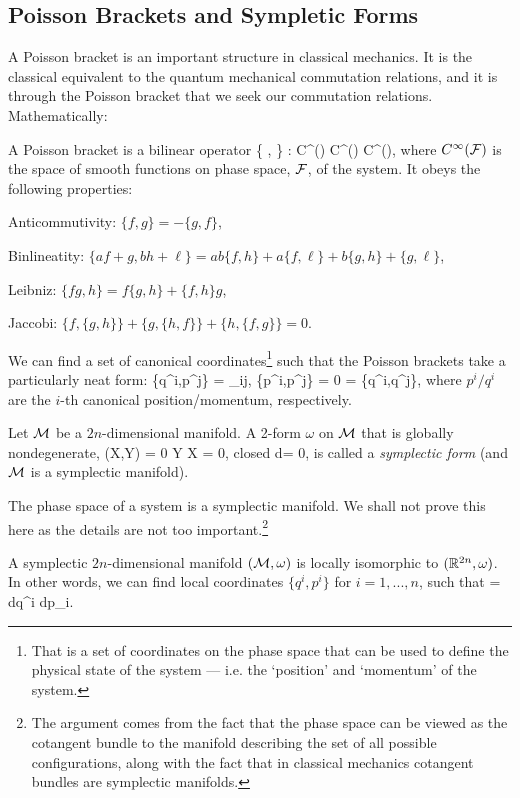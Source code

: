 \subsection{Poisson Brackets and Sympletic Forms}

A Poisson bracket is an important structure in classical mechanics. It is the classical equivalent to the quantum mechanical commutation relations, and it is through the Poisson bracket that we seek our commutation relations. Mathematically: 

A Poisson bracket is a bilinear operator 
\bse 
    \{ \cdot, \cdot \} : C^{\infty}(\cF) \times  C^{\infty}(\cF) \to  C^{\infty}(\cF),
\ese 
where $C^{\infty}(\mathcal{F})$ is the space of smooth functions on phase space, $\mathcal{F}$, of the system. It obeys the following properties: 
\ben 
\item Anticommutivity: $\{f,g\} = -\{g,f\}$, 
\item Binlineatity: $\{af+g,bh+\ell\} = ab\{f,h\} + a\{f,\ell\} + b\{g,h\} + \{g,\ell\}$,
\item Leibniz: $\{fg,h\} = f\{g,h\} + \{f,h\}g$,
\item Jaccobi: $\{f,\{g,h\}\} + \{g,\{h,f\}\} + \{h,\{f,g\}\} =0$.
\een 
\ed 

We can find a set of canonical coordinates\footnote{That is a set of coordinates on the phase space that can be used to define the physical state of the system --- i.e. the `position' and `momentum' of the system.} such that the Poisson brackets take a particularly neat form:
\be 
\label{eqn:PoissonCanonical}
    \{q^i,p^j\} = \del_{ij}, \qquad \{p^i,p^j\} = 0 = \{q^i,q^j\},
\ee 
where $p^i/q^i$ are the $i$-th canonical position/momentum, respectively. 

Let $\mathcal{M}$ be a $2n$-dimensional manifold. A 2-form $\omega$ on $\mathcal{M}$ that is globally nondegenerate,
\bse 
    \omega(X,Y) = 0 \quad \forall Y \implies X = 0,
\ese 
closed
\bse 
    d\omega = 0,
\ese 
is called a \textit{symplectic form} (and $\mathcal{M}$ is a symplectic manifold). 
\ed 

\bcl
The phase space of a system is a symplectic manifold. 
\ecl
We shall not prove this here as the details are not too important.\footnote{The argument comes from the fact that the phase space can be viewed as the cotangent bundle to the manifold describing the set of all possible configurations, along with the fact that in classical mechanics cotangent bundles are symplectic manifolds.}

\bt[Darboux] 
A symplectic $2n$-dimensional manifold $(\mathcal{M},\omega)$ is locally isomorphic to $(\mathbb{R}^{2n},\omega)$. In other words, we can find local coordinates $\{q^i,p^i\}$ for $i=1,...,n$, such that 
\bse
    \omega = dq^i \wedge dp_i.
\ese 
\et 

